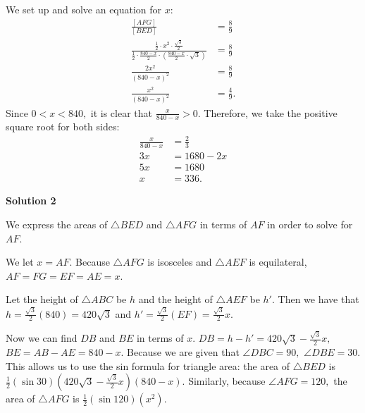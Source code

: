 \begin{enumerate}
 We set up and solve an equation for $x:$
 \begin{align*} \frac{[AFG]}{[BED]}&=\frac89 \\ \frac{\frac12\cdot x^2\cdot\frac{\sqrt3}{2}}{\frac12\cdot\frac{840-x}{2}\cdot\left(\frac{840-x}{2}\cdot\sqrt3\right)}&=\frac89 \\ \frac{2x^2}{(840-x)^2}&=\frac89 \\ \frac{x^2}{(840-x)^2}&=\frac49. \end{align*}
Since $0<x<840,$ it is clear that $\frac{x}{840-x}>0.$ Therefore, we take the positive square root for both sides:
 \begin{align*} \frac{x}{840-x}&=\frac23 \\ 3x&=1680-2x \\ 5x&=1680 \\ x&=\boxed{336}. \end{align*}





\textbf{Solution 2}

We express the areas of $\triangle BED$ and $\triangle AFG$ in terms of $AF$ in order to solve for $AF.$

 We let $x = AF.$ Because $\triangle AFG$ is isosceles and $\triangle AEF$ is equilateral, $AF = FG = EF = AE = x.$ 

 Let the height of $\triangle ABC$ be $h$ and the height of $\triangle AEF$ be $h'.$ Then we have that $h = \frac{\sqrt{3}}{2}(840) = 420\sqrt{3}$ and $h' = \frac{\sqrt{3}}{2}(EF) = \frac{\sqrt{3}}{2}x.$ 

 Now we can find $DB$ and $BE$ in terms of $x.$ $DB = h - h' = 420\sqrt{3} - \frac{\sqrt{3}}{2}x,$ $BE = AB - AE = 840 - x.$ Because we are given that $\angle DBC = 90,$ $\angle DBE = 30.$ This allows us to use the sin formula for triangle area: the area of $\triangle BED$ is $\frac{1}{2}(\sin 30)\left(420\sqrt{3} - \frac{\sqrt{3}}{2}x\right)(840-x).$ Similarly, because $\angle AFG = 120,$ the area of $\triangle AFG$ is $\frac{1}{2}(\sin 120)(x^2).$


\end{enumerate}
